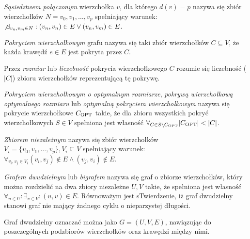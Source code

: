 \begin{definition}
  \emph{Sąsiedztwem połączonym} wierzchołka $v$, dla którego $d(v)=p$ nazywa się zbiór wierzchołków 
  $N={v_0, v_1, \ldots, v_p}$ spełniający warunek:\\
  $\not \exists_{v_n, v_m \in N}:{(v_n,v_n) \in E \lor (v_n,v_m) \in E}$.
\end{definition}

\begin{definition}
  \emph{Pokryciem wierzchołkowym} grafu nazywa się taki zbiór wierzchołków
  $C \subseteq V$, że każda krawędź $e \in E$ jest pokryta przez $C$.
\end{definition}

\begin{definition}
  Przez \emph{rozmiar} lub \emph{liczebność} pokrycia wierzchołkowego $C$ rozumie się liczebność ($|C|$)
  zbioru wierzchołków reprezentującą tę pokrywę.
\end{definition}

\begin{definition}
  \emph{Pokryciem wierzchołkowym o optymalnym rozmiarze}, \emph{pokrywą 
  wierzchołkową optymalnego rozmiaru} lub \emph{optymalną pokryciem wierzchołkowym} 
  nazywa się pokrycie wierzchołkowe $C_{\textnormal{OPT}}$ takie, że dla zbioru wszystkich pokryć wierzchołkowych $S \in V$ spełniona jest własność $\forall_{C \in S \setminus C_{\textnormal{OPT}}}{|C_{\textnormal{OPT}}| < |C|}$.
\end{definition}

\begin{definition}
  \emph{Zbiorem niezależnym} nazywa się zbiór wierzchołków\\
  $V_i=\{v_0, v_1, \ldots, v_p \}, V_i \subseteq V$ spełniający warunek:
  $\forall_{v_i, v_j \in V_i}{(v_i, v_j) \notin E \land (v_j, v_i) \notin E}$.
\end{definition}

\begin{definition}
  \emph{Grafem dwudzielnym} lub \emph{bigrafem} nazywa się graf o zbiorze 
  wierzchołków, który można rozdzielić na dwa zbiory niezależne $U, V$ takie, że spełniona jest własność
  $\forall_{u \in U}: \exists_{v \in V}: (u,v) \in E$.
  Równoważym jest sTwierdzenie, iż graf dwudzielny stanowi graf nie mający
  żadnego cyklu o nieparzystej długości.

  Graf dwudzielny oznaczać można jako $G=(U,V,E)$, nawiązując do poszczególnych
  podzbiorów wierzchołków oraz krawędzi między nimi.
\end{definition}

